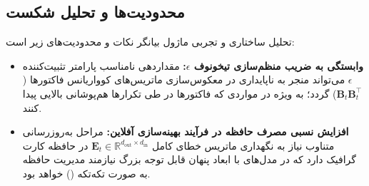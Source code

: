 \subsection{محدودیت‌ها و تحلیل شکست}
تحلیل ساختاری و تجربی ماژول بیانگر نکات و محدودیت‌های زیر است:
\begin{itemize}
    \item \textbf{وابستگی به ضریب منظم‌سازی تیخونوف $\epsilon$:} مقداردهی نامناسب پارامتر تثبیت‌کننده $\epsilon$ می‌تواند منجر به ناپایداری در معکوس‌سازی ماتریس‌های کوواریانس فاکتورها ($\mathbf{B}_t \mathbf{B}_t^\top$) گردد؛ به ویژه در مواردی که فاکتورها در طی تکرارها هم‌پوشانی بالایی پیدا کنند.
    \item \textbf{افزایش نسبی مصرف حافظه در فرآیند بهینه‌سازی آفلاین:} مراحل به‌روزرسانی متناوب نیاز به نگهداری ماتریس خطای کامل $\mathbf{E}_t \in \mathbb{R}^{d_{\text{out}} \times d_{\text{in}}}$ در حافظه کارت گرافیک دارد که در مدل‌های با ابعاد پنهان قابل توجه بزرگ نیازمند مدیریت حافظه به صورت تکه‌تکه () خواهد بود.
\end{itemize}
